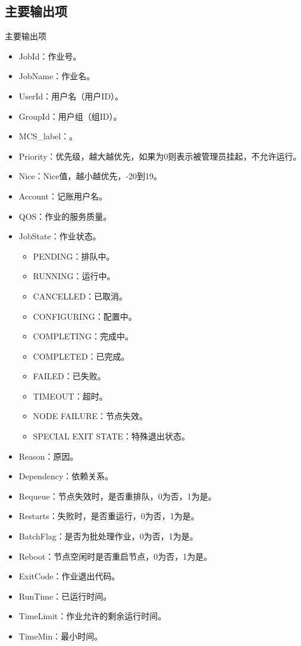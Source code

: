 \subsection{主要输出项}
\begin{frame}{主要输出项}
\begin{itemize}
	\item JobId：作业号。
	\item JobName：作业名。
	\item UserId：用户名（用户ID）。
	\item GroupId：用户组（组ID）。
	\item MCS\_label：。
	\item Priority：优先级，越大越优先，如果为0则表示被管理员挂起，不允许运行。
	\item Nice：Nice值，越小越优先，-20到19。
	\item Account：记账用户名。
	\item QOS：作业的服务质量。
	\item JobState：作业状态。
\begin{itemize}
	\item PENDING：排队中。
	\item RUNNING：运行中。
	\item CANCELLED：已取消。
	\item CONFIGURING：配置中。
	\item COMPLETING：完成中。
	\item COMPLETED：已完成。
	\item FAILED：已失败。
	\item TIMEOUT：超时。
	\item NODE FAILURE：节点失效。
	\item SPECIAL EXIT STATE：特殊退出状态。
\end{itemize}
	\item Reason：原因。
	\item Dependency：依赖关系。
	\item Requeue：节点失效时，是否重排队，0为否，1为是。
	\item Restarts：失败时，是否重运行，0为否，1为是。
	\item BatchFlag：是否为批处理作业，0为否，1为是。
	\item Reboot：节点空闲时是否重启节点，0为否，1为是。
	\item ExitCode：作业退出代码。
	\item RunTime：已运行时间。
	\item TimeLimit：作业允许的剩余运行时间。
	\item TimeMin：最小时间。

\end{itemize}
\end{frame}
